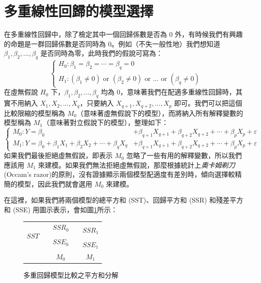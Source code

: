 \section{多重線性回歸的模型選擇}
    在多重線性回歸中，除了檢定其中一個回歸係數是否為 $0$ 外，有時候我們有興趣的命題是一群回歸係數是否同時為 $0$。例如（不失一般性地）我們想知道 $\beta_1, \beta_2, ..., \beta_q$ 是否同時為零，此時我們的假說可寫為：
    \[\left\{\begin{array}{l}
        H_0: \beta_1 = \beta_2 = \cdots = \beta_q = 0\\
        H_1: (\beta_1 \ne 0) \text{ or } (\beta_2 \ne 0) \text{ or } ... \text{ or } (\beta_q \ne 0)
    \end{array}\right.\]
    在虛無假說 $H_0$ 下，$\beta_1, \beta_2, ..., \beta_q$ 均為 $0$，意味著我們在配適多重線性回歸時，其實不用納入 $X_1, X_2, ..., X_q$，只要納入 $X_{q+1}, X_{q+2}, ..., X_p$ 即可。我們可以把這個比較限縮的模型稱為 $M_0$（意味著虛無假說下的模型），而將納入所有解釋變數的模型稱為 $M_1$（意味著對立假說下的模型），整理如下：
    \[\left\{\begin{array}{ll}
        M_0: Y = \beta_0  &+ \beta_{q+1} X_{q+1} + \beta_{q+2} X_{q+2} + \cdots + \beta_{p} X_{p} + \varepsilon\\
        M_1: Y = \beta_0 + \beta_1 X_1 + \beta_2 X_2 + \cdots  + \beta_q X_q &+ \beta_{q+1} X_{q+1} + \beta_{q+2} X_{q+2} + \cdots + \beta_{p} X_{p} + \varepsilon
    \end{array}\right.\]
    如果我們最後拒絕虛無假說，即表示 $M_0$ 忽略了一些有用的解釋變數，所以我們應該用 $M_1$ 來建模。如果我們無法拒絕虛無假說，那麼根據統計上\textit{奧卡姆剃刀} (Occam's razor)的原則，沒有證據顯示兩個模型配適度有差別時，傾向選擇較精簡的模型，因此我們就會選用 $M_0$ 來建模。
    
    在這裡，如果我們將兩個模型的總平方和 (SST)、回歸平方和 (SSR) 和殘差平方和 (SSE) 用圖示表示，會如圖\ref{fig:anova}所示：

    \begin{figure}[htbp]
        \centering
        \begin{tabular}{|c|c|c|c|c|}
            \cline{1-1}\cline{3-3}\cline{5-5}
            \multirow{8}{*}{$SST$} && \multirow{4}{*}{$SSR_0$} && \multirow{6}{*}{$SSR_1$}\\
             && &&  \\
             && &&  \\
             && &&  \\
            \cline{3-3}
             && \multirow{4}{*}{$SSE_0$} && \\
             && &&  \\
            \cline{5-5}
             && && \multirow{2}{*}{$SSE_1$} \\
             && &&  \\
            \cline{1-1}\cline{3-3}\cline{5-5}
            \multicolumn{1}{c}{}&\multicolumn{1}{c}{}& \multicolumn{1}{c}{$M_0$} &\multicolumn{1}{c}{}& \multicolumn{1}{c}{$M_1$} 
        \end{tabular}
        \caption{多重回歸模型比較之平方和分解}
        \label{fig:anova}
    \end{figure}

